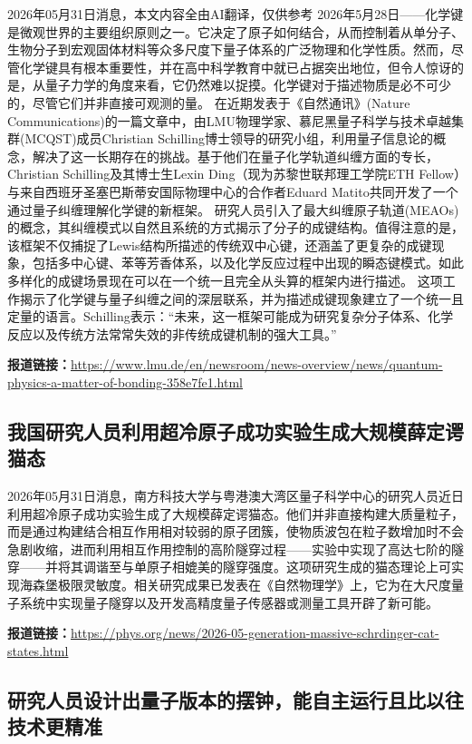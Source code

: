 \documentclass[12pt,a4paper]{ctexart}
\begin{document}
2026年05月31日消息，本文内容全由AI翻译，仅供参考
2026年5月28日——化学键是微观世界的主要组织原则之一。它决定了原子如何结合，从而控制着从单分子、生物分子到宏观固体材料等众多尺度下量子体系的广泛物理和化学性质。然而，尽管化学键具有根本重要性，并在高中科学教育中就已占据突出地位，但令人惊讶的是，从量子力学的角度来看，它仍然难以捉摸。化学键对于描述物质是必不可少的，尽管它们并非直接可观测的量。
在近期发表于《自然通讯》(Nature Communications)的一篇文章中，由LMU物理学家、慕尼黑量子科学与技术卓越集群(MCQST)成员Christian Schilling博士领导的研究小组，利用量子信息论的概念，解决了这一长期存在的挑战。基于他们在量子化学轨道纠缠方面的专长，Christian Schilling及其博士生Lexin Ding（现为苏黎世联邦理工学院ETH Fellow）与来自西班牙圣塞巴斯蒂安国际物理中心的合作者Eduard Matito共同开发了一个通过量子纠缠理解化学键的新框架。
研究人员引入了最大纠缠原子轨道(MEAOs)的概念，其纠缠模式以自然且系统的方式揭示了分子的成键结构。值得注意的是，该框架不仅捕捉了Lewis结构所描述的传统双中心键，还涵盖了更复杂的成键现象，包括多中心键、苯等芳香体系，以及化学反应过程中出现的瞬态键模式。如此多样化的成键场景现在可以在一个统一且完全从头算的框架内进行描述。
这项工作揭示了化学键与量子纠缠之间的深层联系，并为描述成键现象建立了一个统一且定量的语言。Schilling表示：“未来，这一框架可能成为研究复杂分子体系、化学反应以及传统方法常常失效的非传统成键机制的强大工具。”

\noindent\textbf{报道链接：}\url{https://www.lmu.de/en/newsroom/news-overview/news/quantum-physics-a-matter-of-bonding-358e7fe1.html}

\subsection{ 我国研究人员利用超冷原子成功实验生成大规模薛定谔猫态 }

2026年05月31日消息，南方科技大学与粤港澳大湾区量子科学中心的研究人员近日利用超冷原子成功实验生成了大规模薛定谔猫态。他们并非直接构建大质量粒子，而是通过构建结合相互作用相对较弱的原子团簇，使物质波包在粒子数增加时不会急剧收缩，进而利用相互作用控制的高阶隧穿过程——实验中实现了高达七阶的隧穿——并将其调谐至与单原子相媲美的隧穿强度。这项研究生成的猫态理论上可实现海森堡极限灵敏度。相关研究成果已发表在《自然物理学》上，它为在大尺度量子系统中实现量子隧穿以及开发高精度量子传感器或测量工具开辟了新可能。

\noindent\textbf{报道链接：}\url{https://phys.org/news/2026-05-generation-massive-schrdinger-cat-states.html}

\subsection{ 研究人员设计出量子版本的摆钟，能自主运行且比以往技术更精准 }
\end{document}
